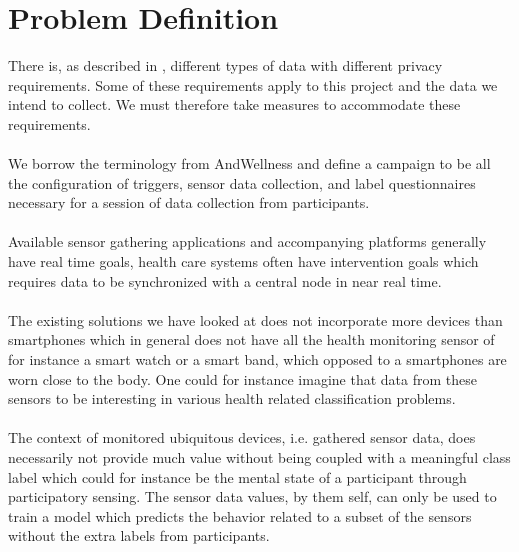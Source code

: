 
\section{Problem Definition} 
\label{sec:problem_definition}
There is, as described in , different types of data with different privacy requirements. Some of these requirements apply to this project and the data we intend to collect. We must therefore take measures to accommodate these requirements. 
\\\\
We borrow the terminology from AndWellness \parencite{hicks2010andwellness} and define a campaign to be all the configuration of triggers, sensor data collection, and label questionnaires necessary for a session of data collection from participants.    
\\\\
Available sensor gathering applications and accompanying platforms generally have real time goals, health care systems often have intervention goals which requires data to be synchronized with a central node in near real time. 
\\\\
The existing solutions we have looked at does not incorporate more devices than smartphones which in general does not have all the health monitoring sensor of for instance a smart watch or a smart band, which opposed to a smartphones are worn close to the body. One could for instance imagine that data from these sensors to be interesting in various health related classification problems. 
\\\\
The context of monitored ubiquitous devices, i.e. gathered sensor data, does necessarily not provide much value without being coupled with a meaningful class label which could for instance be the mental state of a participant through participatory sensing. The sensor data values, by them self, can only be used to train a model which predicts the behavior related to a subset of the sensors without the extra labels from participants. 

